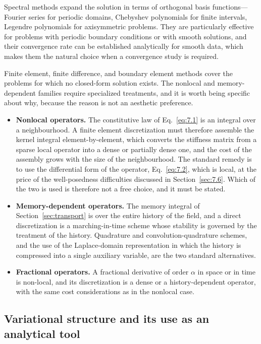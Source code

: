 Spectral methods expand the solution in terms of orthogonal basis functions---Fourier series for periodic domains, Chebyshev polynomials for finite intervals, Legendre polynomials for axisymmetric problems. They are particularly effective for problems with periodic boundary conditions or with smooth solutions, and their convergence rate can be established analytically for smooth data, which makes them the natural choice when a convergence study is required.

Finite element, finite difference, and boundary element methods cover the problems for which no closed-form solution exists. The nonlocal and memory-dependent families require specialized treatments, and it is worth being specific about why, because the reason is not an aesthetic preference.

\begin{itemize}
\item \textbf{Nonlocal operators.} The constitutive law of Eq.~\eqref{eq:7.1} is an integral over a neighbourhood. A finite element discretization must therefore assemble the kernel integral element-by-element, which converts the stiffness matrix from a sparse local operator into a dense or partially dense one, and the cost of the assembly grows with the size of the neighbourhood. The standard remedy is to use the differential form of the operator, Eq.~\eqref{eq:7.2}, which is local, at the price of the well-posedness difficulties discussed in Section~\ref{sec:7.6}. Which of the two is used is therefore not a free choice, and it must be stated.
\item \textbf{Memory-dependent operators.} The memory integral of Section~\ref{sec:transport} is over the entire history of the field, and a direct discretization is a marching-in-time scheme whose stability is governed by the treatment of the history. Quadrature and convolution-quadrature schemes, and the use of the Laplace-domain representation in which the history is compressed into a single auxiliary variable, are the two standard alternatives.
\item \textbf{Fractional operators.} A fractional derivative of order $\alpha$ in space or in time is non-local, and its discretization is a dense or a history-dependent operator, with the same cost considerations as in the nonlocal case.
\end{itemize}

\subsection{Variational structure and its use as an analytical tool}
\label{sec:8.9}

